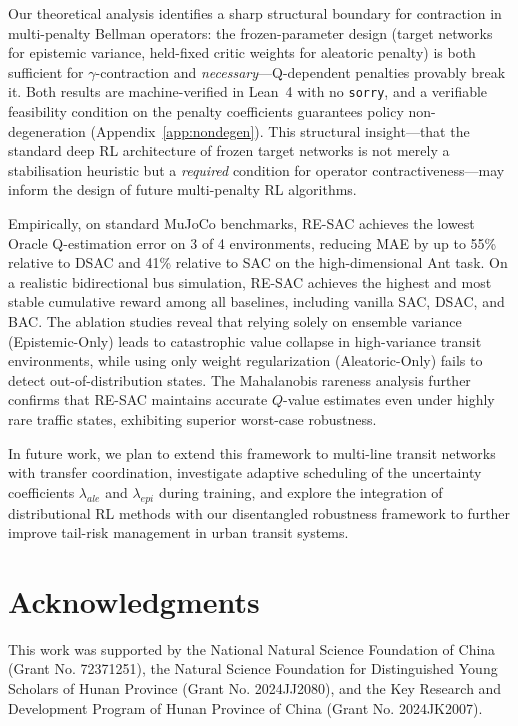 \documentclass[10pt]{article}
\begin{document}
Our theoretical analysis identifies a sharp structural boundary for contraction in multi-penalty Bellman operators: the frozen-parameter design (target networks for epistemic variance, held-fixed critic weights for aleatoric penalty) is both sufficient for $\gamma$-contraction and \emph{necessary}---Q-dependent penalties provably break it.  Both results are machine-verified in Lean~4 with no \texttt{sorry}, and a verifiable feasibility condition on the penalty coefficients guarantees policy non-degeneration (Appendix~\ref{app:nondegen}).  This structural insight---that the standard deep RL architecture of frozen target networks is not merely a stabilisation heuristic but a \emph{required} condition for operator contractiveness---may inform the design of future multi-penalty RL algorithms.

Empirically, on standard MuJoCo benchmarks, RE-SAC achieves the lowest Oracle Q-estimation error on 3 of 4 environments, reducing MAE by up to 55\% relative to DSAC and 41\% relative to SAC on the high-dimensional Ant task. On a realistic bidirectional bus simulation, RE-SAC achieves the highest and most stable cumulative reward among all baselines, including vanilla SAC, DSAC, and BAC. The ablation studies reveal that relying solely on ensemble variance (Epistemic-Only) leads to catastrophic value collapse in high-variance transit environments, while using only weight regularization (Aleatoric-Only) fails to detect out-of-distribution states. The Mahalanobis rareness analysis further confirms that RE-SAC maintains accurate $Q$-value estimates even under highly rare traffic states, exhibiting superior worst-case robustness.

In future work, we plan to extend this framework to multi-line transit networks with transfer coordination, investigate adaptive scheduling of the uncertainty coefficients $\lambda_{ale}$ and $\lambda_{epi}$ during training, and explore the integration of distributional RL methods with our disentangled robustness framework to further improve tail-risk management in urban transit systems.

\section*{Acknowledgments}
This work was supported by the National Natural Science Foundation of China (Grant No. 72371251), the Natural Science Foundation for Distinguished Young Scholars of Hunan Province (Grant No. 2024JJ2080), and the Key Research and Development Program of Hunan Province of China (Grant No. 2024JK2007).




\end{document}
